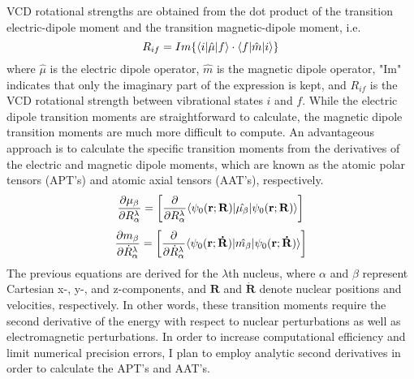     VCD rotational strengths are obtained from the dot product of the transition electric-dipole moment and the transition magnetic-dipole moment, i.e.
        \begin{equation}
            R_{if} = Im\{\langle i |\hat{\mu}| f \rangle\cdot\langle f |\hat{m}| i \rangle\}
        \end{equation}
    where $\hat{\mu}$ is the electric dipole operator, $\hat{m}$ is the magnetic dipole operator, "Im" indicates that only the imaginary part of the expression is kept, and $R_{if}$ is the VCD rotational strength between vibrational states $i$ and $f$. While the electric dipole transition moments are straightforward to calculate, the magnetic dipole transition moments are much more difficult to compute. An advantageous approach is to calculate the specific transition moments from the derivatives of the electric and magnetic dipole moments, which are known as the atomic polar tensors (APT's) and atomic axial tensors (AAT's), respectively\cite{Stephens1985}.
    \begin{equation}
        \frac{\partial\mu_\beta}{\partial{R^\lambda_\alpha}} = \bigg[ \frac{\partial}{\partial{R^\lambda_\alpha}} \langle\psi_0(\mathbf{r};\mathbf{R}) |\hat{{\mu}_\beta}| \psi_0(\mathbf{r};\mathbf{R}) \rangle \bigg]
    \end{equation}
    \begin{equation}
        \frac{\partial{m}_\beta}{\partial{\dot{R}^\lambda_\alpha}} = \bigg[ \frac{\partial}{\partial{\dot{R}^\lambda_\alpha}} \langle\psi_0(\mathbf{r};\mathbf{\dot{R}}) |\hat{{m}_\beta}| \psi_0(\mathbf{r};\mathbf{\dot{R}}) \rangle \bigg]
    \end{equation}
    The previous equations are derived for the $\lambda$th nucleus, where $\alpha$ and $\beta$ represent Cartesian x-, y-, and z-components, and $\bm{R}$ and $\bm{\dot{R}}$ denote nuclear positions and velocities, respectively. In other words, these transition moments require the second derivative of the energy with respect to nuclear perturbations as well as electromagnetic perturbations. In order to increase computational efficiency and limit numerical precision errors, I plan to employ analytic second derivatives in order to calculate the APT's and AAT's.
     
